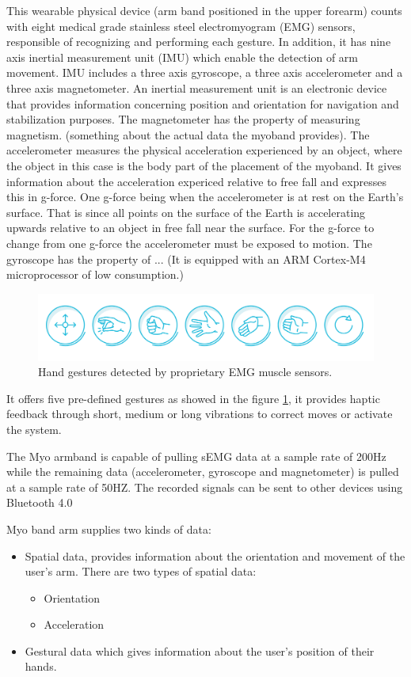 This wearable physical device (arm band positioned in the upper forearm) counts with eight medical grade stainless steel electromyogram (EMG) sensors, responsible of recognizing and performing each gesture. In addition, it has nine axis inertial measurement unit (IMU) which enable the detection of arm movement. IMU includes a three axis gyroscope,  a three axis accelerometer and a three axis magnetometer. An inertial measurement unit is an electronic device that provides information concerning position and orientation for navigation and stabilization purposes. The magnetometer has the property of measuring magnetism. (something about the actual data the myoband provides). The accelerometer measures the physical acceleration experienced by an object, where the object in this case is the body part of the placement of the myoband. It gives information about the acceleration expericed relative to free fall and expresses this in g-force. One g-force being when the accelerometer is at rest on the Earth's surface. That is since all points on the surface of the Earth is accelerating upwards relative to an object in free fall near the surface. For the g-force to change from one g-force the accelerometer must be exposed to motion. The gyroscope has the property of ... (It is equipped with an ARM Cortex-M4 microprocessor of low consumption.)

\begin{figure}[H]                    
	\includegraphics[width=.5\textwidth]{figures/myob/gestures}  %
	\caption{Hand gestures detected by proprietary EMG muscle sensors. \cite{}}
	\label{fig:gestures}  %
\end{figure}
It offers five pre-defined gestures as showed in the figure \ref{fig:gestures}, it provides haptic feedback through short, medium or long vibrations to correct moves or activate the system.

The Myo armband is capable of pulling sEMG data at a sample rate of 200Hz while the remaining data (accelerometer, gyroscope and magnetometer) is pulled at a sample rate of  50HZ. The recorded signals can be sent to other devices using Bluetooth 4.0 

Myo band arm supplies two kinds of data:
\begin{itemize}
\item Spatial data, provides information about the orientation and movement of the user's arm. There are two types of spatial data:
\begin{itemize}
\item Orientation
\item Acceleration
\end{itemize}
\item Gestural data which gives information about the user's position of their hands.

\end{itemize}


